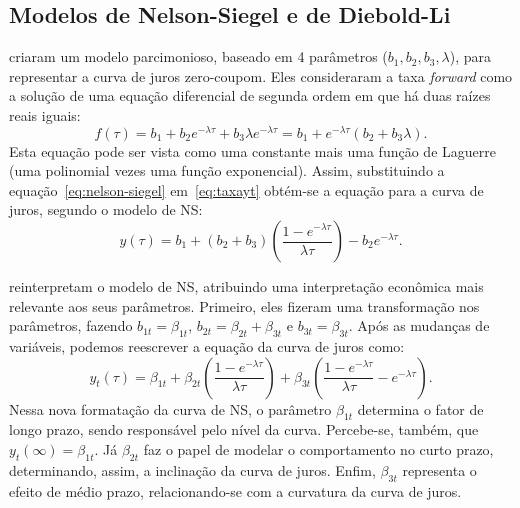 \documentclass[
	12pt,				%
	openright,			%
	oneside,			%
	a4paper,			%
	english,			%
	brazil				%
	]{dissertacao-ufrgs-abntex2}
\begin{document}



\subsection{Modelos de Nelson-Siegel e de Diebold-Li}

 criaram um modelo parcimonioso, baseado em 4 parâmetros
($b_{1},b_{2},b_{3},\lambda$), para representar a curva de juros
zero-coupom. Eles consideraram a taxa \emph{forward} como a solução de uma
equação diferencial de segunda ordem em que há duas raízes reais iguais:
\begin{equation} \label{eq:nelson-siegel}
f(\tau)=b_{1}+b_{2}e^{-\lambda\tau}+b_{3}\lambda e^{-\lambda\tau}=b_1+e^{-\lambda \tau}(b_2+b_3 \lambda).
\end{equation}
Esta equação pode ser vista como uma constante mais uma função de
Laguerre (uma polinomial vezes uma função exponencial). Assim, substituindo a equação~\ref{eq:nelson-siegel} em~\ref{eq:taxayt}
obtém-se a equação para a curva de juros, segundo o modelo de NS:
\begin{equation}
y(\tau)=b_{1}+(b_{2}+b_{3})\left(\frac{1-e^{-\lambda\tau}}{\lambda\tau}\right)-b_{2}e^{-\lambda\tau}.
\end{equation}

 reinterpretam o modelo de NS, atribuindo uma interpretação econômica mais relevante
aos seus parâmetros. Primeiro, eles fizeram uma transformação nos
parâmetros, fazendo $b_{1t}=\beta_{1t}$, $b_{2t}=\beta_{2t}+\beta_{3t}$
e $b_{3t}=\beta_{3t}$. Após as mudanças de variáveis, podemos reescrever a equação da curva de juros como:
\begin{equation}
y_t(\tau)=\beta_{1t}+\beta_{2t}\left(\frac{1-e^{-\lambda\tau}}{\lambda\tau}\right)+\beta_{3t}\left(\frac{1-e^{-\lambda\tau}}{\lambda\tau}-e^{-\lambda\tau}\right).
\end{equation}
Nessa nova formatação da curva de NS, o parâmetro $\beta_{1t}$ determina
o fator de longo prazo, sendo responsável pelo nível da curva. Percebe-se,
também, que $y_{t}(\infty)=\beta_{1t}$. Já $\beta_{2t}$ faz o papel
de modelar o comportamento no curto prazo, determinando, assim, a
inclinação da curva de juros. Enfim, $\beta_{3t}$ representa o efeito
de médio prazo, relacionando-se com a curvatura da curva de juros.
\end{document}
